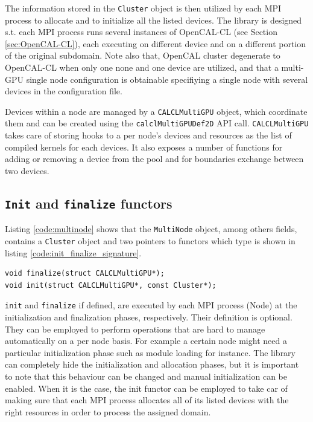 The information stored in the \texttt{Cluster} object is then utilized by each MPI process to allocate and to initialize all the listed devices.
The library is designed s.t. each MPI process runs several instances of  OpenCAL-CL (see Section \ref{sec:OpenCAL-CL}), each executing on different device and on a different portion of the original subdomain.
Note also that, OpenCAL cluster degenerate to OpenCAL-CL when only one none and one device are utilized, and that a multi-GPU single node configuration is obtainable specifiying a single node with several devices in the configuration file.

Devices within a node are managed by a \texttt{CALCLMultiGPU} object,  which  coordinate them and can be created using the \texttt{calclMultiGPUDef2D} API call. \texttt{CALCLMultiGPU} takes care of storing hooks to a per node's devices and resources as the list of compiled kernels for each devices.
It also exposes a number of functions for adding or removing a device from the pool and for boundaries exchange between two devices. 


\subsection{\texttt{Init} and \texttt{finalize} functors}
Listing \ref{code:multinode} shows that the \texttt{MultiNode} object, among others fields, contains a \texttt{Cluster} object and two pointers to functors which type is shown in listing \ref{code:init_finalize_signature}.
\begin{lstlisting}
void finalize(struct CALCLMultiGPU*);
void init(struct CALCLMultiGPU*, const Cluster*);
\end{lstlisting}

\texttt{init} and \texttt{finalize} if defined, are executed by each MPI process (Node) at the initialization and finalization phases, respectively.
Their definition is optional. They can be employed to perform operations that are hard to manage automatically on a per node basis. For example a certain node might need a particular initialization phase such as module loading for instance. The library can completely hide the initialization and allocation phases, but it is important to note that this behaviour can be changed and manual initialization can be enabled. When it is the case, the init functor can be employed to take car of making sure that each MPI process allocates all of its listed devices with the right resources in order to process the assigned domain. 

